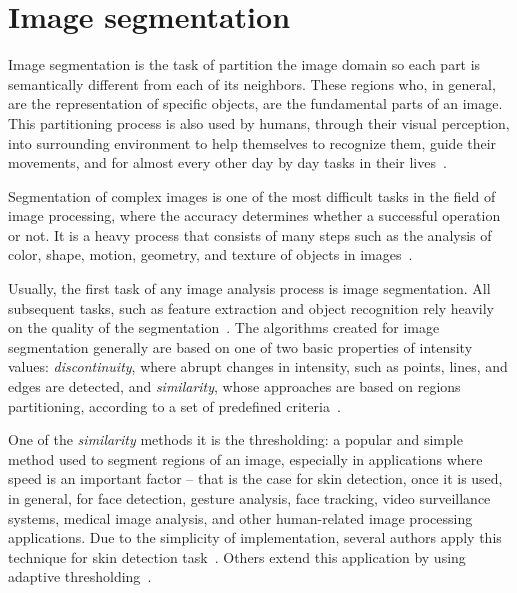 \section{Image segmentation}
\label{sec:image_segmentation}
Image segmentation is the task of partition the image domain so each part is semantically different from each of its neighbors. These regions who, in general, are the representation of specific objects, are the fundamental parts of an image. This partitioning process is also used by humans, through their visual perception, into surrounding environment to help themselves to recognize them, guide their movements, and for almost every other day by day tasks in their lives~\citep{konstantinos:00}.

Segmentation of complex images is one of the most difficult tasks in the field of image processing, where the accuracy determines whether a successful operation or not. It is a heavy process that consists of many steps such as the analysis of color, shape, motion, geometry, and texture of objects in images~\citep{gonzalez:02}.

Usually, the first task of any image analysis process is image segmentation. All subsequent tasks, such as feature extraction and object recognition rely heavily on the quality of the segmentation~\citep{konstantinos:00}. The algorithms created for image segmentation generally are based on one of two basic properties of intensity values: \emph{discontinuity}, where abrupt changes in intensity, such as points, lines, and edges are detected, and \emph{similarity}, whose approaches are based on regions partitioning, according to a set of predefined criteria~\citep{gonzalez:02}.

One of the \emph{similarity} methods it is the thresholding: a popular and simple method used to segment regions of an image, especially in applications where speed is an important factor -- that is the case for skin detection, once it is used, in general, for face detection, gesture analysis, face tracking, video surveillance systems, medical image analysis, and other human-related image processing applications. Due to the simplicity of implementation, several authors apply this technique for skin detection task~\citep{kovac:03, chai:99, basilio:11, kaur:12, shaik:15, kumar:15}. Others extend this application by using adaptive thresholding~\citep{yogarajah:11, tan:12}.


